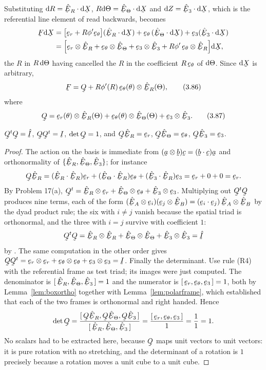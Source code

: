 Substituting $\dl R=\ip{\hER}{\dl\bX}$, $R\dl\Theta=\ip{\hETh}{\dl\bX}$
and $\dl Z=\ip{\hbE_{3}}{\dl\bX}$, which is the referential line element
of  read backwards,  becomes
\[
\begin{aligned}
   \bF\dl\bX
   &=\big[\ber+R\phi'\bet\big](\ip{\hER}{\dl\bX})
     +\bet\,(\ip{\hETh}{\dl\bX})+\be_{3}(\ip{\hbE_{3}}{\dl\bX})\\
   &=\Big[\ber\otimes\hER+\bet\otimes\hETh+\be_{3}\otimes\hbE_{3}
     +R\phi'\,\bet\otimes\hER\Big]\dl\bX ,
\end{aligned}
\]
the $R$ in $R\,\mathrm{d}\Theta$ having cancelled the $R$ in the coefficient
$R\,\bet$ of $\mathrm{d}\Theta$. Since $\dl\bX$ is arbitrary,
\begin{equation}
   \bF=\bQ+R\phi'(R)\,\bet(\theta)\otimes\hER(\Theta),
   \tag{3.86}\label{eq:3.86}
\end{equation}
where
\begin{equation}
   \bQ=\ber(\theta)\otimes\hER(\Theta)+\bet(\theta)\otimes\hETh(\Theta)
      +\be_{3}\otimes\hbE_{3}.
   \tag{3.87}\label{eq:3.87}
\end{equation}

\begin{lemma}\label{lem:Qrot}
$\bQ^{t}\bQ=\hI$, $\bQ\bQ^{t}=\I$, $\det\bQ=1$, and
$\bQ\hER=\ber$, $\bQ\hETh=\bet$, $\bQ\hbE_{3}=\be_{3}$.
\end{lemma}

\begin{proof}
The action on the basis is immediate from
$(\ba\otimes\bb)\bc=(\ip\bb\bc)\ba$ and orthonormality of
$\{\hER,\hETh,\hbE_{3}\}$; for instance
\[
   \bQ\hER=(\ip{\hER}{\hER})\ber+(\ip{\hETh}{\hER})\bet
          +(\ip{\hbE_{3}}{\hER})\be_{3}=\ber+0+0=\ber .
\]
By Problem 17(a), $\bQ^{t}=\hER\otimes\ber+\hETh\otimes\bet
+\hbE_{3}\otimes\be_{3}$. Multiplying out $\bQ^{t}\bQ$ produces nine
terms, each of the form
$(\hbE_{A}\otimes\be_{i})(\be_{j}\otimes\hbE_{B})
=(\ip{\be_{i}}{\be_{j}})\,\hbE_{A}\otimes\hbE_{B}$ by the dyad product
rule; the six with $i\neq j$ vanish because the spatial triad is
orthonormal, and the three with $i=j$ survive with coefficient $1$:
\[
   \bQ^{t}\bQ=\hER\otimes\hER+\hETh\otimes\hETh+\hbE_{3}\otimes\hbE_{3}
   =\hI
\]
by . The same computation in the other order gives
$\bQ\bQ^{t}=\ber\otimes\ber+\bet\otimes\bet+\be_{3}\otimes\be_{3}=\I$.
Finally the determinant. Use rule (R4) with the referential frame as test
triad; its images were just computed. The denominator is
$\tbox{\hER}{\hETh}{\hbE_{3}}=1$ and the numerator is
$\tbox{\ber}{\bet}{\be_{3}}=1$, both by
Lemma~\ref{lem:boxortho} together with Lemma~\ref{lem:polarframe}, which
established that each of the two frames is orthonormal and right handed.
Hence
\[
   \det\bQ=\frac{\tbox{\bQ\hER}{\bQ\hETh}{\bQ\hbE_{3}}}
                {\tbox{\hER}{\hETh}{\hbE_{3}}}
          =\frac{\tbox{\ber}{\bet}{\be_{3}}}{1}=\frac{1}{1}=1 .
\]
No scalars had to be extracted here, because $\bQ$ maps unit vectors to
unit vectors: it is pure rotation with no stretching, and the determinant
of a rotation is $1$ precisely because a rotation moves a unit cube to a
unit cube.
\end{proof}

